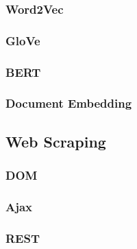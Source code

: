\subsubsection{Word2Vec}
\subsubsection{GloVe}
\subsubsection{BERT}
\subsubsection{Document Embedding}

\subsection{Web Scraping}
\subsubsection{DOM}
\subsubsection{Ajax}
\subsubsection{REST}

